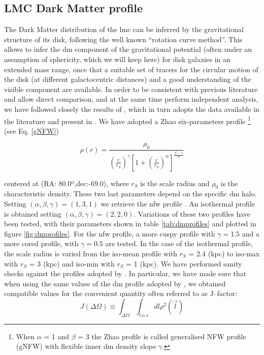 \documentclass{article}
\begin{document}
 \subsection{LMC Dark Matter profile}
 \label{LMCprofile\gls{dm}}  
 \par The Dark Matter distribution of the \gls{lmc} can be inferred by the gravitational structure of its disk, following the well known ``rotation curve method''. This allows to infer the \gls{dm} component of the gravitational potential (often under an assumption of sphericity, which we will keep here) for disk galaxies in an extended mass range, once that a suitable set of tracers for the circular motion of the disk (at different galactocentric distances) and a good understanding of the visible component are available.
In order to be consistent with previous literature and allow direct comparison, and at the same time perform independent analysis, we have followed closely the results of \cite{Buckley:2015doa}, which in turn adopts the data available in the literature and present in \cite{1998ApJ...503..674K,1992A&A...263...41L,vanderMarel:2013jza}.
We have adopted a Zhao six-parameters profile \cite{1996MNRAS.278..488Z}\footnote{When $\alpha$ = 1 and $\beta$ = 3 the Zhao profile is called generalised NFW profile (gNFW) with flexible inner \gls{dm} density slope $\gamma$.} (see Eq. \ref{gNFW}) 

\begin{equation}
    \rho(r) = \frac{\rho_{0}}{\left(\frac{r}{r_{S}}\right)^{\gamma}\left[ 1+\left(\frac{r}{r_{S}} \right)^{\alpha}\right]^{\frac{\beta-\gamma}{\alpha}}}
\label{gNFW}
\end{equation}

centered at  (RA: 80.0º,dec:-69.0), where $r_{S}$ is the scale radius and $\rho_{0}$ is the characteristic density. These two last parameters depend on the specific \gls{dm} halo. 
Setting $(\alpha,\beta,\gamma) = (1,3,1)$ we retrieve the \gls{nfw} profile \cite{NFW}. An isothermal profile is obtained setting $(\alpha,\beta,\gamma) = (2,2,0)$. Variations of these two profiles have been tested, with their parameters shown in table \ref{tab:dmprofiles} and plotted in figure \ref{fig:dmprofiles}. For the \gls{nfw} profile, a more cuspy profile with $\gamma=1.5$ and a more cored profile, with $\gamma=0.5$ are tested. In the case of the isothermal profile, the scale radius is varied from the iso-mean profile with $r_{S}$ = 2.4 (kpc) to iso-max with $r_{S}$ = 3 (kpc) and iso-min with $r_{S}$ = 1 (kpc).
We have performed sanity checks against the profiles adopted by \cite{Buckley:2015doa}. In particular, we have made sure that when using the same values of the \gls{dm} profile adopted by \cite{Buckley:2015doa}, we obtained compatible values for the convenient quantity often referred to as J--factor:
\begin{equation}
J(\Delta \Omega) \equiv \int_{\Delta\Omega}\int_{l.o.s} dl \rho^2(\vec{l})
\label{JfactorDef}
\end{equation}
\end{document}
